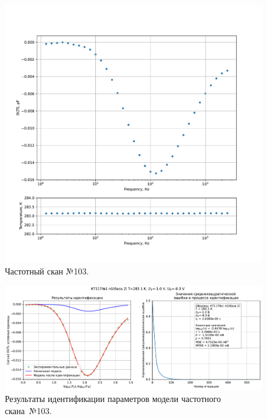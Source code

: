 \begin{figure}[!ht]
    \centering
    \includegraphics[width=1\textwidth]{../plots/КТ117№1_п1(база 2)_2500Гц-1Гц_1пФ_+10С_-1В-8В_200мВ_20мкс_шаг_0,1.pdf}
    \caption{Частотный скан №103.}
    \label{pic:frequency_scan_103}
\end{figure}

\begin{figure}[!ht]
    \centering
    \includegraphics[width=1\textwidth]{../plots/КТ117№1_п1(база 2)_2500Гц-1Гц_1пФ_+10С_-1В-8В_200мВ_20мкс_шаг_0,1_model.pdf}
    \caption{Результаты идентификации параметров модели частотного скана~№103.}
    \label{pic:frequency_scan_model103}
\end{figure}

\pagebreak


